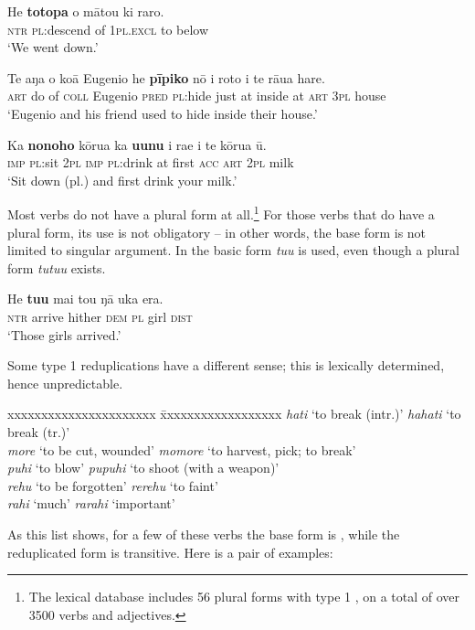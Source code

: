 \ea\label{ex:2.15}
\gll He \textbf{totopa} o mātou ki raro. \\
\textsc{ntr} \textsc{pl}:descend of \textsc{1pl.excl} to below \\

\glt 
‘We went down.’ \textstyleExampleref{[R157.040]} 
\z

\ea\label{ex:2.16}
\gll Te aŋa o koā Eugenio he \textbf{pīpiko} nō {\ꞌ}i roto i te rāua hare. \\
\textsc{art} do of \textsc{coll} Eugenio \textsc{pred} \textsc{pl}:hide just at inside at \textsc{art} \textsc{3pl} house \\

\glt 
‘Eugenio and his friend used to hide inside their house.’ \textstyleExampleref{[R231.279]} 
\z

\ea\label{ex:2.17}
\gll Ka \textbf{nonoho} kōrua ka \textbf{uunu} {\ꞌ}i ra{\ꞌ}e i te kōrua ū. \\
\textsc{imp} \textsc{pl}:sit \textsc{2pl} \textsc{imp} \textsc{pl}:drink at first \textsc{acc} \textsc{art} \textsc{2pl} milk \\

\glt
‘Sit down (pl.) and first drink your milk.’ \textstyleExampleref{[R334.117]} 
\z

Most verbs do not have a plural form at all.\footnote{\label{fn:82}The lexical database includes 56 plural forms with type 1 , on a total of over 3500 verbs and adjectives.} For those verbs that do have a plural form, its use is not obligatory – in other words, the base form is not limited to singular argument. In  the basic form \textit{tu{\ꞌ}u} is used, even though a plural form \textit{tutu{\ꞌ}u} exists.

\ea\label{ex:2.18}
\gll He \textbf{tu{\ꞌ}u} mai tou ŋā uka era. \\
\textsc{ntr} arrive hither \textsc{dem} \textsc{pl} girl \textsc{dist} \\

\glt 
‘Those girls arrived.’ \textstyleExampleref{[Blx-3.053]}
\z

Some type 1 reduplications have a different sense; this is lexically determined, hence unpredictable. 
\ea
\begin{tabbing}
xxxxxxxxxxxxxxxxxxxxxx \= xxxxxxxxxxxxxxxxxx\kill
\textit{hati} ‘to break (intr.)’ \> \textit{hahati} ‘to break (tr.)’\\
\textit{more} ‘to be cut, wounded’ \> \textit{momore} ‘to harvest, pick; to break’\\
\textit{puhi} ‘to blow’ \> \textit{pupuhi} ‘to shoot (with a weapon)’\\
\textit{rehu} ‘to be forgotten’ \> \textit{rerehu} ‘to faint’\\
\textit{rahi} ‘much’ \> \textit{rarahi} ‘important’
\end{tabbing}
\z 
As this list shows, for a few of these verbs the base form is , while the reduplicated form is transitive. Here is a pair of examples:

